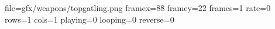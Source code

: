 file=gfx/weapons/topgatling.png
framex=88
framey=22
frames=1
rate=0
rows=1
cols=1
playing=0
looping=0
reverse=0
